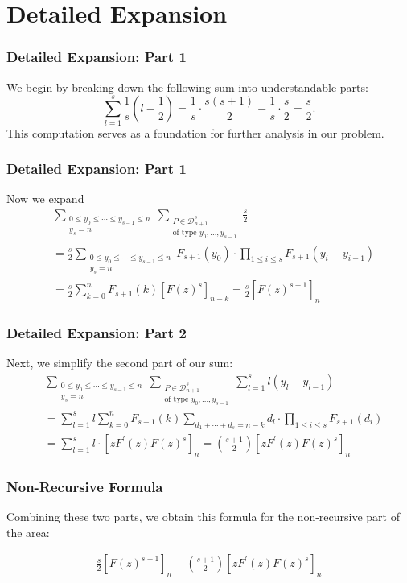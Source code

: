 \documentclass{beamer}
\begin{document}
\section{Detailed Expansion}
\begin{frame}
\frametitle{Detailed Expansion: Part 1}

We begin by breaking down the following sum into understandable parts:
\[
  \sum_{l=1}^{s}\frac{1}{s}\left(l-\frac{1}{2}\right) = \frac{1}{s}\cdot \frac{s(s+1)}{2}-\frac{1}{s}\cdot\frac{s}{2} = \frac{s}{2}.
\]
This computation serves as a foundation for further analysis in our problem.
\end{frame}

\begin{frame}
\frametitle{Detailed Expansion: Part 1}
Now we expand 
\begin{align*}
  & \sum_{\substack{0\leq y_{0}\leq \cdots\leq y_{s-1}\leq n\\y_{s}=n}} \sum_{\substack{P\in \mathcal{D}_{n+1}^{s}\\\text{of type }y_{0},\ldots, y_{s-1}}} \frac{s}{2} \\
  & = \frac{s}{2} \sum_{\substack{0\leq y_{0}\leq \cdots\leq y_{s-1}\leq n\\y_{s}=n}}  F_{s+1}(y_{0}) \cdot \prod_{1\leq i \leq s} F_{s+1}(y_{i}-y_{i-1}) \\
  & = \frac{s}{2} \sum_{k=0}^{n}F_{s+1}(k)[F(z)^{s}]_{n-k} = \frac{s}{2} [F(z)^{s+1}]_{n} 
\end{align*}
\end{frame}

\begin{frame}
\frametitle{Detailed Expansion: Part 2}
Next, we simplify the second part of our sum:
\begin{align*}
  & \sum_{\substack{0\leq y_{0}\leq \cdots\leq y_{s-1}\leq n\\y_{s}=n}} \sum_{\substack{P\in \mathcal{D}_{n+1}^{s}\\ \text{of type }y_{0},\ldots, y_{s-1}}} \sum_{l=1}^{s} l(y_{l}-y_{l-1}) \\
  &= \sum_{l=1}^{s}l\sum_{k=0}^{n}F_{s+1}(k) \sum_{d_{1}+\cdots+d_{s}=n-k}  d_{l}\cdot  \prod_{1\leq i \leq s} F_{s+1}(d_{i})\\
  & = \sum_{l=1}^{s}l \cdot[zF^{\prime}(z)F(z)^{s}]_{n} = {s+1 \choose 2}[zF^{\prime}(z)F(z)^{s}]_{n}
\end{align*}
\end{frame}

\begin{frame}
\frametitle{Non-Recursive Formula}
Combining these two parts, we obtain this formula for the non-recursive part of the area:

\begin{align*}
  \frac{s}{2} [F(z)^{s+1}]_{n} + {s+1 \choose 2}[zF^{\prime}(z)F(z)^{s}]_{n}
\end{align*}
\end{frame}
\end{document}
